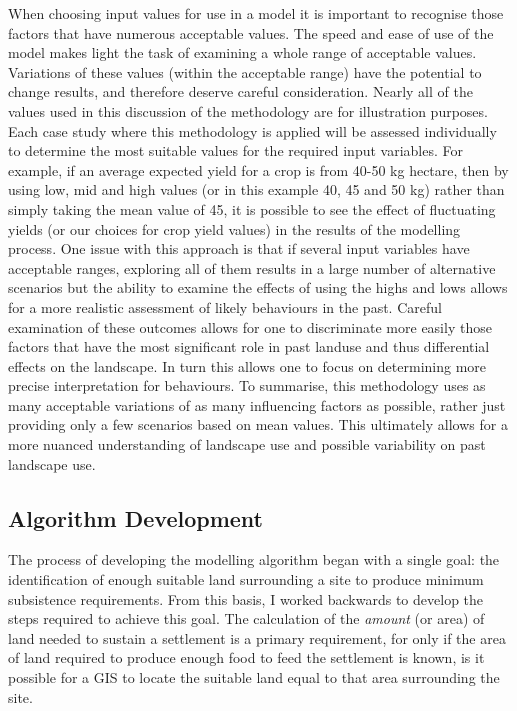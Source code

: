 When choosing input values for use in a model it is important to recognise those factors that have numerous acceptable values. The speed and ease of use of the model makes light the task of examining a whole range of acceptable values.  Variations of these values (within the acceptable range) have the potential to change results, and therefore deserve careful consideration.  Nearly all of the values used in this discussion of the methodology are for illustration purposes.  Each case study where this methodology is applied will be assessed individually to determine the most suitable values for the required input variables.
For example, if an average expected yield for a crop is from 40-50 kg hectare\per, then by using low, mid and high values (or in this example 40, 45 and 50 kg) rather than simply taking the mean value of 45, it is possible to see the effect of fluctuating yields (or our choices for crop yield values) in the results of the modelling process.  
One issue with this approach is that if several input variables have acceptable ranges, exploring all of them results in a large number of alternative scenarios but the ability to examine the effects of using the highs and lows allows for a more realistic assessment of likely behaviours in the past.
Careful examination of these outcomes allows for one to discriminate  more easily those factors that have the most significant role in past landuse and thus differential effects on the landscape. In turn this allows one to focus on determining more precise interpretation  for behaviours. 
  To summarise, this methodology uses as many acceptable variations of as many influencing factors as possible, rather just providing only a few scenarios based on mean values. This ultimately allows for a more nuanced understanding of landscape use and possible variability on past landscape use.  

\subsection{Algorithm Development}
	\label{AlgorithmDevelopment}
The process of developing the modelling algorithm began with a single goal: the identification of enough suitable land surrounding a site to produce minimum subsistence requirements. From this basis, I worked backwards to develop the steps required to achieve this goal.  The calculation of the \textit{amount} (or area) of land needed to sustain a settlement is a primary requirement, for only if the area of land required to produce enough food to feed the settlement is known, is it possible for a GIS to locate the suitable land equal to that area surrounding the site.  %

